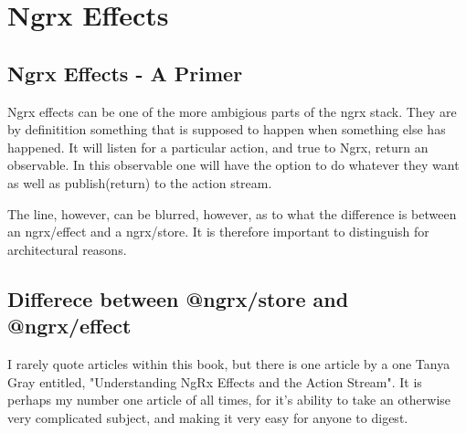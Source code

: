 \maketitle{}
\section{ Ngrx Effects }

\subsection{Ngrx Effects - A Primer}
Ngrx effects can be one of the more ambigious parts of the ngrx stack. They are
by definitition something that is supposed to happen when something else has
happened. It will listen for a particular action, and true to Ngrx, return an
observable. In this observable one will have the option to do whatever they want
as well as publish(return) to the action stream.

The line, however, can be blurred, however, as to what the difference is between
an ngrx/effect and a ngrx/store. It is therefore important to distinguish for
architectural reasons.

\subsection{Differece between @ngrx/store and @ngrx/effect}
I rarely quote articles within this book, but there is one article by a one
Tanya Gray entitled, "Understanding NgRx Effects and the Action Stream". It is
perhaps my number one article of all times, for it's ability to take an
otherwise very complicated subject, and making it very easy for anyone to
digest.
